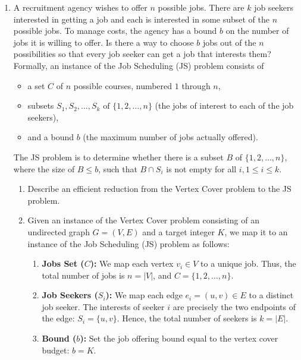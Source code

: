 \documentclass[12pt,a4paper]{article}
\makeatletter
\newtheorem*{solution}{Solution}
\theoremstyle{definition}
\renewenvironment{solution}[1][Solution] {\par\pushQED{\qed}\normalfont\topsep6\p@\@plus6\p@\relax\trivlist\item[\hskip\labelsep\bfseries#1\@addpunct{.}]\ignorespaces}{\popQED\endtrivlist\@endpefalse} \makeatother
\makeatother
\begin{document}
\begin{enumerate}

    \item {\color{purple}{(NP-Complete)}} 
    
    A recruitment agency wishes to offer $n$ possible jobs. There are $k$ job seekers interested in getting a job and each is interested in some subset of the $n$ possible jobs. To manage costs, the agency has a bound $b$ on the number of jobs it is willing to offer. Is there a way to choose $b$ jobs out of the $n$ possibilities so that every job seeker can get a job that interests them? Formally, an instance of the Job Scheduling (JS) problem consists of
    
    \begin{itemize}
        \item a set $C$ of $n$ possible courses, numbered $1$ through $n$, 
        
        \item subsets $S_1, S_2, \dots, S_k \text{ of } \{1, 2, \dots, n\}$ (the jobs of interest to each of the job seekers), 
        
        \item and a bound $b$ (the maximum number of jobs actually offered).
    \end{itemize}

    The JS problem is to determine whether there is a subset $B$ of $\{1, 2, \dots, n\}$, where the size of $B \leq b$, such that $B \cap S_i$ is not empty for all $i, 1 \leq i \leq k$.

    \begin{enumerate}
        \item Describe an efficient reduction from the Vertex Cover problem to the JS problem.
        
        \begin{solution}
        Given an instance of the Vertex Cover problem consisting of an undirected graph $G = (V, E)$ and a target integer $K$, we map it to an instance of the Job Scheduling (JS) problem as follows:
        \begin{enumerate}
            \item \textbf{Jobs Set ($C$):} We map each vertex $v_i \in V$ to a unique job. Thus, the total number of jobs is $n = |V|$, and $C = \{1, 2, \dots, n\}$.
            \item \textbf{Job Seekers ($S_i$):} We map each edge $e_i = (u, v) \in E$ to a distinct job seeker. The interests of seeker $i$ are precisely the two endpoints of the edge: $S_i = \{u, v\}$. Hence, the total number of seekers is $k = |E|$.
            \item \textbf{Bound ($b$):} Set the job offering bound equal to the vertex cover budget: $b = K$.
        \end{enumerate}
        \end{solution}


\end{enumerate}
\end{enumerate}
\end{document}
